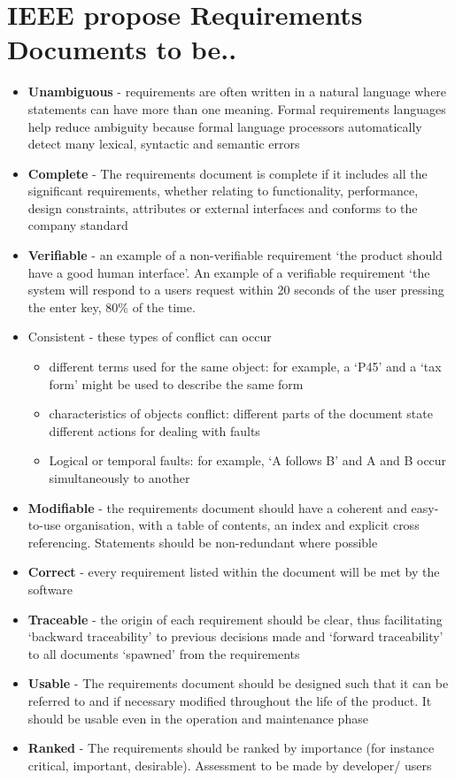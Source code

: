 \documentclass{article}[18pt]
\begin{document}
\section{IEEE propose Requirements Documents to be..}
\begin{itemize}
	\item \textbf{Unambiguous} - requirements are often written in a natural language where statements can have more than one meaning. Formal requirements languages help reduce ambiguity because formal language processors automatically detect many lexical, syntactic and semantic errors
	\item \textbf{Complete} - The requirements document is complete if it includes all the significant requirements, whether relating to functionality, performance, design constraints, attributes or external interfaces and conforms to the company standard
	\item \textbf{Verifiable} - an example of a non-verifiable requirement ‘the product should have a good human interface’. An example of a verifiable requirement ‘the system will respond to a users request within 20 seconds of the user pressing the enter key, 80\% of the time.
	\item Consistent - these types of conflict can occur
	\begin{itemize}
		\item different terms used for the same object: for example, a ‘P45’ and a ‘tax form’ might be used to describe the same form
		\item characteristics of objects conflict: different parts of the document state different actions for dealing with faults
		\item Logical or temporal faults: for example, ‘A follows B’ and A and B occur simultaneously to another
	\end{itemize}
	\item \textbf{Modifiable} - the requirements document should have a coherent and easy-to-use organisation, with a table of contents, an index and explicit cross referencing. Statements should be non-redundant where possible
	\item \textbf{Correct} - every requirement listed within the document will be met by the software
	\item \textbf{Traceable} - the origin of each requirement should be clear, thus facilitating ‘backward traceability’ to previous decisions made and ‘forward traceability’ to all documents ‘spawned’ from the requirements
	\item \textbf{Usable} - The requirements document should be designed such that it can be referred to and if necessary modified throughout the life of the product. It should be usable even in the operation and maintenance phase
	\item \textbf{Ranked} - The requirements should be ranked by importance (for instance critical, important, desirable). Assessment to be made by developer/ users
\end{itemize}
\end{document}
